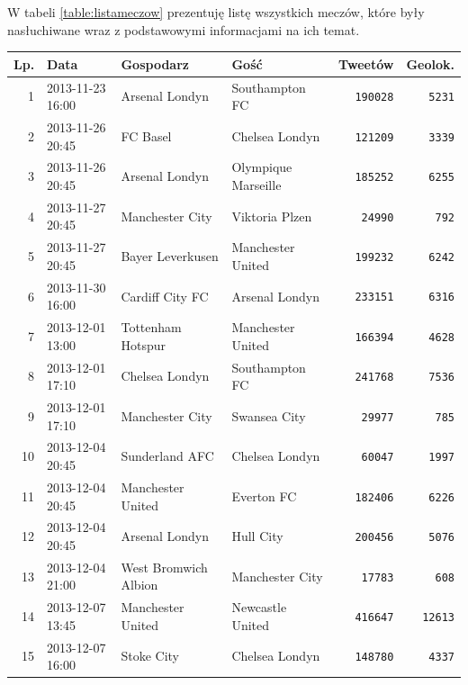 W tabeli \ref{table:listameczow} prezentuję listę wszystkich meczów, które były 
nasłuchiwane wraz z podstawowymi informacjami na ich temat.



\clearpage

\begin{table}[ht!]  
\begin{center}  
\begin{tabular}{|r|l|l|l|r|r|}
\hline
Lp. & Data & Gospodarz & Gość & Tweetów & Geolok.
\\ \hline 
1 & 2013-11-23 16:00 & Arsenal Londyn & Southampton FC & \texttt{190028} & \texttt{5231}	\\ \hline
2 & 2013-11-26 20:45 & FC Basel & Chelsea Londyn & \texttt{121209} & \texttt{3339}	\\ \hline
3 & 2013-11-26 20:45 & Arsenal Londyn & Olympique Marseille & \texttt{185252} & \texttt{6255}	\\ \hline
4 & 2013-11-27 20:45 & Manchester City & Viktoria Plzen & \texttt{24990} & \texttt{792}	\\ \hline
5 & 2013-11-27 20:45 & Bayer Leverkusen & Manchester United & \texttt{199232} & \texttt{6242}	\\ \hline
6 & 2013-11-30 16:00 & Cardiff City FC & Arsenal Londyn & \texttt{233151} & \texttt{6316}	\\ \hline
7 & 2013-12-01 13:00 & Tottenham Hotspur & Manchester United & \texttt{166394} & \texttt{4628}	\\ \hline
8 & 2013-12-01 17:10 & Chelsea Londyn & Southampton FC & \texttt{241768} & \texttt{7536}	\\ \hline
9 & 2013-12-01 17:10 & Manchester City & Swansea City & \texttt{29977} & \texttt{785}	\\ \hline
10 & 2013-12-04 20:45 & Sunderland AFC & Chelsea Londyn & \texttt{60047} & \texttt{1997}	\\ \hline
11 & 2013-12-04 20:45 & Manchester United & Everton FC & \texttt{182406} & \texttt{6226}	\\ \hline
12 & 2013-12-04 20:45 & Arsenal Londyn & Hull City & \texttt{200456} & \texttt{5076}	\\ \hline
13 & 2013-12-04 21:00 & West Bromwich Albion & Manchester City & \texttt{17783} & \texttt{608}	\\ \hline
14 & 2013-12-07 13:45 & Manchester United & Newcastle United & \texttt{416647} & \texttt{12613}	\\ \hline
15 & 2013-12-07 16:00 & Stoke City & Chelsea Londyn & \texttt{148780} & \texttt{4337}	\\ \hline

\end{tabular}
\end{center}
\end{table}
